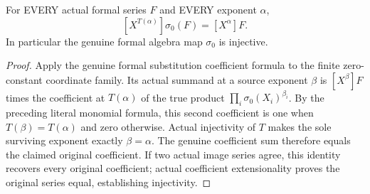 \begin{theorem}
\label{hir:actual-formal-monomial-blowup-coefficient-reflection}
For EVERY actual formal series $F$ and EVERY exponent $\alpha$,
\[
 [X^{T(\alpha)}]\sigma_0(F)=[X^\alpha]F.
\]
In particular the genuine formal algebra map $\sigma_0$ is injective.
\leanok
\end{theorem}
\begin{proof}
Apply the genuine formal substitution coefficient formula to the finite
zero-constant coordinate family. Its actual summand at a source exponent
$\beta$ is $[X^\beta]F$ times the coefficient at $T(\alpha)$ of the
true product $\prod_i\sigma_0(X_i)^{\beta_i}$.
By the preceding literal monomial formula, this second coefficient is
one when $T(\beta)=T(\alpha)$ and zero otherwise. Actual injectivity of
$T$ makes the sole surviving exponent exactly $\beta=\alpha$.
The genuine coefficient sum therefore equals the claimed original
coefficient. If two actual image series agree, this identity recovers
every original coefficient; actual coefficient extensionality proves
the original series equal, establishing injectivity.
\end{proof}

